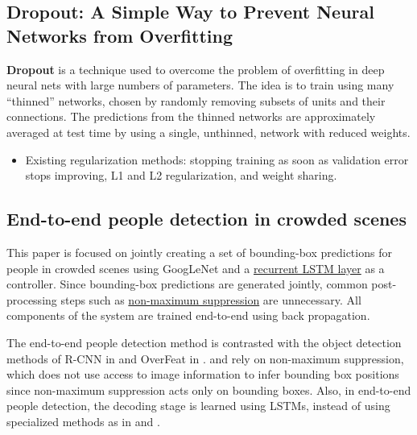 \documentclass[a4paper, 12pt]{article}
\begin{document}
\subsection{Dropout: A Simple Way to Prevent Neural Networks from
            Overfitting\cite{Srivastava:2014:DSW:2627435.2670313}}

\textbf{Dropout} is a technique used to overcome the problem of overfitting in
deep neural nets with large numbers of parameters. The idea is to train using
many ``thinned'' networks, chosen by randomly removing subsets of units and
their connections. The predictions from the thinned networks are approximately
averaged at test time by using a single, unthinned, network with reduced
weights.

\begin{itemize}
        \item Existing regularization methods: stopping training as soon as
                validation error stops improving, L1 and L2 regularization, and
                weight sharing\cite{Nowlan:1992:SNN:148167.148169}.
\end{itemize}

\subsection{End-to-end people detection in crowded
            scenes\cite{DBLP:journals/corr/StewartA15}}

This paper is focused on jointly creating a set of bounding-box predictions for
people in crowded scenes using GoogLeNet and a
\hyperref[LSTM]{recurrent LSTM layer} as a controller. Since bounding-box
predictions are generated jointly, common post-processing steps such as
\hyperref[nonmax_supression]{non-maximum suppression} are unnecessary.  All
components of the system are trained end-to-end using back propagation.

The end-to-end people detection method is contrasted with the object detection
methods of R-CNN in \cite{DBLP:journals/corr/GirshickDDM13} and OverFeat in
\cite{DBLP:journals/corr/SermanetEZMFL13}.
\cite{DBLP:journals/corr/GirshickDDM13} and
\cite{DBLP:journals/corr/SermanetEZMFL13} rely on non-maximum suppression,
which does not use access to image information to infer bounding box positions
since non-maximum suppression acts only on bounding boxes. Also, in end-to-end
people detection, the decoding stage is learned using LSTMs, instead of using
specialized methods as in \cite{VisualPhrases} and \cite{TaAnSc_14:occluded}.
\end{document}
